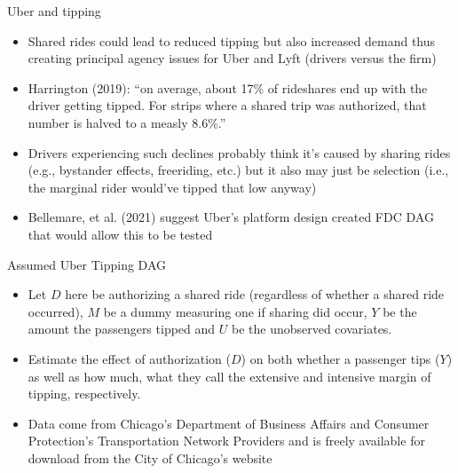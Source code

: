 \documentclass{beamer}
\begin{document}
\begin{frame}{Uber and tipping}

  \begin{itemize}
    \item Shared rides could lead to reduced tipping but also increased demand thus creating principal agency issues for Uber and Lyft (drivers versus the firm)
    \item Harrington (2019): ``on average, about 17\% of rideshares end up with the driver getting tipped.  For strips where a shared trip was authorized, that number is halved to a measly 8.6\%.''
    \item Drivers experiencing such declines probably think it's caused by sharing rides (e.g., bystander effects, freeriding, etc.) but it also may just be selection (i.e., the marginal rider would've tipped that low anyway)
    \item Bellemare, et al. (2021) suggest Uber's platform design created FDC DAG that would allow this to be tested
  \end{itemize}

\end{frame}
\begin{frame}{Assumed Uber Tipping DAG}

  \begin{center}
  \end{center}


  \begin{itemize}
    \item Let $D$ here be authorizing a shared ride (regardless of whether a shared ride occurred), $M$ be a dummy measuring one if sharing did occur, $Y$ be the amount the passengers tipped and $U$ be the unobserved covariates.
    \item Estimate the effect of authorization ($D$) on both whether a passenger tips ($Y$) as well as how much, what they call the extensive and intensive margin of tipping, respectively.
    \item Data come from Chicago's Department of Business Affairs and Consumer Protection's Transportation Network Providers and is freely available for download from the City of Chicago's website
  \end{itemize}

\end{frame}
\end{document}
